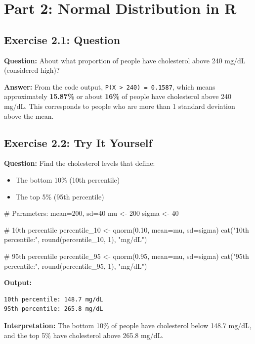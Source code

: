 \documentclass[11pt]{article}
\begin{document}
\section{Part 2: Normal Distribution in R}

\subsection{Exercise 2.1: Question}

\textbf{Question:} About what proportion of people have cholesterol above 240 mg/dL (considered high)?

\textcolor{correctgreen}{\textbf{Answer:}} From the code output, \texttt{P(X > 240) = 0.1587}, which means approximately \textbf{15.87\%} or about \textbf{16\%} of people have cholesterol above 240 mg/dL. This corresponds to people who are more than 1 standard deviation above the mean.

\subsection{Exercise 2.2: Try It Yourself}

\textbf{Question:} Find the cholesterol levels that define:
\begin{itemize}
\item The bottom 10\% (10th percentile)
\item The top 5\% (95th percentile)
\end{itemize}

\begin{rcode}
# Parameters: mean=200, sd=40
mu <- 200
sigma <- 40

# 10th percentile
percentile_10 <- qnorm(0.10, mean=mu, sd=sigma)
cat("10th percentile:", round(percentile_10, 1), "mg/dL\n")

# 95th percentile
percentile_95 <- qnorm(0.95, mean=mu, sd=sigma)
cat("95th percentile:", round(percentile_95, 1), "mg/dL\n")
\end{rcode}

\begin{routput}
\textbf{Output:}
\begin{verbatim}
10th percentile: 148.7 mg/dL
95th percentile: 265.8 mg/dL
\end{verbatim}
\end{routput}

\textcolor{correctgreen}{\textbf{Interpretation:}} The bottom 10\% of people have cholesterol below 148.7 mg/dL, and the top 5\% have cholesterol above 265.8 mg/dL.
\end{document}
